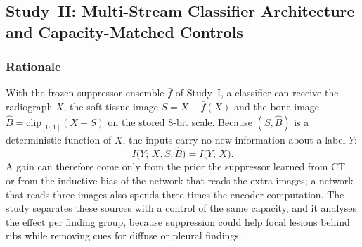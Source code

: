 \subsection{Study~II: Multi-Stream Classifier Architecture and Capacity-Matched Controls}
\label{sec:m-study2}

\subsubsection{Rationale}
With the frozen suppressor ensemble $\bar f$ of Study~I, a classifier can receive the radiograph $X$, the soft-tissue image
$S=X-\bar f(X)$ and the bone image $\hat B=\mathrm{clip}_{[0,1]}(X-S)$ on the stored 8-bit scale. Because $(S,\hat B)$ is a deterministic
function of $X$, the inputs carry no new information about a label $Y$:
\begin{equation}
I\big(Y;\,X,S,\hat B\big)=I\big(Y;\,X\big).
\label{eq:info}
\end{equation}
A gain can therefore come only from the prior the suppressor learned from CT, or from the inductive bias of the network that reads the
extra images; a network that reads three images also spends three times the encoder computation. The study separates these sources with a
control of the same capacity, and it analyses the effect per finding group, because suppression could help focal lesions behind ribs while
removing cues for diffuse or pleural findings.

